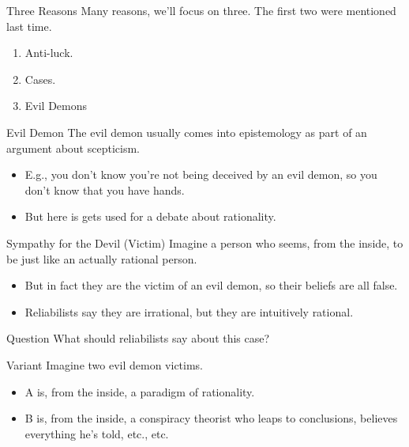 \documentclass[
  17pt,
  letterpaper,
  ignorenonframetext,
  aspectratio=169,
]{beamer}
\providecommand{\tightlist}{%
  \setlength{\itemsep}{0pt}\setlength{\parskip}{0pt}}\usepackage{longtable,booktabs,array}
\begin{document}
\begin{frame}{Three Reasons}
\protect\hypertarget{three-reasons}{}
Many reasons, we'll focus on three. The first two were mentioned last
time.

\begin{enumerate}[<+->]
\tightlist
\item
  Anti-luck.
\item
  Cases.
\item
  Evil Demons
\end{enumerate}
\end{frame}

\begin{frame}{Evil Demon}
\protect\hypertarget{evil-demon}{}
The evil demon usually comes into epistemology as part of an argument
about scepticism.

\begin{itemize}[<+->]
\tightlist
\item
  E.g., you don't know you're not being deceived by an evil demon, so
  you don't know that you have hands.
\item
  But here is gets used for a debate about rationality.
\end{itemize}
\end{frame}

\begin{frame}{Sympathy for the Devil (Victim)}
\protect\hypertarget{sympathy-for-the-devil-victim}{}
Imagine a person who seems, from the inside, to be just like an actually
rational person.

\begin{itemize}[<+->]
\tightlist
\item
  But in fact they are the victim of an evil demon, so their beliefs are
  all false.
\item
  Reliabilists say they are irrational, but they are intuitively
  rational.
\end{itemize}
\end{frame}

\begin{frame}{Question}
\protect\hypertarget{question}{}
What should reliabilists say about this case?
\end{frame}

\begin{frame}{Variant}
\protect\hypertarget{variant}{}
Imagine two evil demon victims.

\begin{itemize}[<+->]
\tightlist
\item
  A is, from the inside, a paradigm of rationality.
\item
  B is, from the inside, a conspiracy theorist who leaps to conclusions,
  believes everything he's told, etc., etc.
\end{itemize}
\end{frame}
\end{document}
